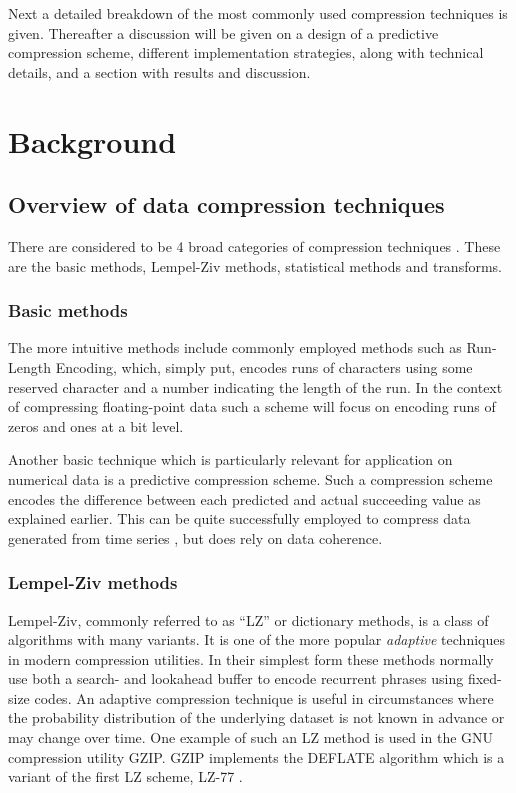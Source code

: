 Next a detailed breakdown of the most commonly used compression techniques is given. Thereafter a discussion will be given on a design of a predictive compression scheme, 
different implementation strategies, along with technical details, and a section with results and discussion.
\section{Background}
\subsection{Overview of data compression techniques}
There are considered to be 4 broad categories of compression techniques \cite{salomon2004data}. These are the basic methods, Lempel-Ziv methods, statistical methods 
and transforms.
\subsubsection{Basic methods}
The more intuitive methods include commonly employed methods such as Run-Length Encoding, which, simply put, encodes runs of characters using some reserved 
character and a number indicating the length of the run. In the context of compressing floating-point data such a scheme will focus on encoding runs of zeros and ones
at a bit level.

Another basic technique which is particularly relevant for application on numerical data is a predictive compression scheme. Such a compression scheme encodes the 
difference between each predicted and actual succeeding value as explained earlier. This can be quite successfully employed to compress data 
generated from time series \cite{engelson2000lossless}, but does rely on data coherence.
\subsubsection{Lempel-Ziv methods}
Lempel-Ziv, commonly referred to as “LZ” or dictionary methods, is a class of algorithms with many variants. It is one of the more popular \textit{adaptive} techniques 
in modern compression utilities. In their simplest form these methods normally use both a search- and lookahead buffer to encode recurrent phrases using fixed-size codes. An 
adaptive compression technique is useful in circumstances where the probability distribution of the underlying dataset is not known in advance or may change over time. 
One example of such an LZ method is used in the GNU compression utility GZIP. GZIP implements the DEFLATE algorithm which is a variant of the first LZ scheme, LZ-77 
\cite[ch. 3]{salomon2004data}.


